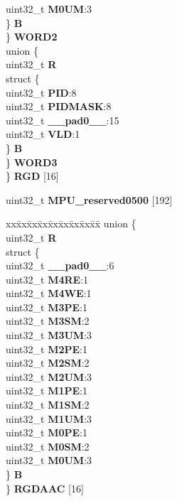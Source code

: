 \begin{DoxyCompactItemize}
\begin{tabbing}
\>\>\>uint32\_t {\bfseries M0UM}:3\\
\>\>\} {\bfseries B}\\
\>\} {\bfseries WORD2}\\
\>union \{\\
\>\>uint32\_t {\bfseries R}\\
\>\>struct \{\\
\>\>\>uint32\_t {\bfseries PID}:8\\
\>\>\>uint32\_t {\bfseries PIDMASK}:8\\
\>\>\>uint32\_t {\bfseries \_\_pad0\_\_}:15\\
\>\>\>uint32\_t {\bfseries VLD}:1\\
\>\>\} {\bfseries B}\\
\>\} {\bfseries WORD3}\\
\} {\bfseries RGD} \mbox{[}16\mbox{]}\\

\end{tabbing}\item 
\mbox{\label{structMPU__tag_a133acf120e45bbbc5afa1abec6aa3333}} 
uint32\+\_\+t {\bfseries M\+P\+U\+\_\+reserved0500} \mbox{[}192\mbox{]}
\item 
\mbox{\label{structMPU__tag_ad4401cc2dbb70c606b3f204722596418}} 
\begin{tabbing}
xx\=xx\=xx\=xx\=xx\=xx\=xx\=xx\=xx\=\kill
union \{\\
\>uint32\_t {\bfseries R}\\
\>struct \{\\
\>\>uint32\_t {\bfseries \_\_pad0\_\_}:6\\
\>\>uint32\_t {\bfseries M4RE}:1\\
\>\>uint32\_t {\bfseries M4WE}:1\\
\>\>uint32\_t {\bfseries M3PE}:1\\
\>\>uint32\_t {\bfseries M3SM}:2\\
\>\>uint32\_t {\bfseries M3UM}:3\\
\>\>uint32\_t {\bfseries M2PE}:1\\
\>\>uint32\_t {\bfseries M2SM}:2\\
\>\>uint32\_t {\bfseries M2UM}:3\\
\>\>uint32\_t {\bfseries M1PE}:1\\
\>\>uint32\_t {\bfseries M1SM}:2\\
\>\>uint32\_t {\bfseries M1UM}:3\\
\>\>uint32\_t {\bfseries M0PE}:1\\
\>\>uint32\_t {\bfseries M0SM}:2\\
\>\>uint32\_t {\bfseries M0UM}:3\\
\>\} {\bfseries B}\\
\} {\bfseries RGDAAC} \mbox{[}16\mbox{]}\\


\end{tabbing}
\end{DoxyCompactItemize}
